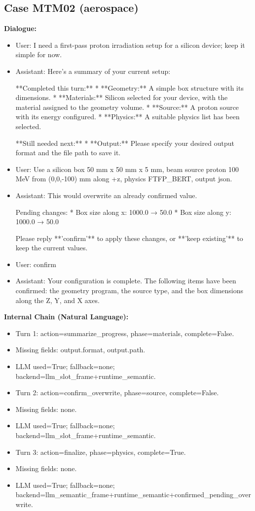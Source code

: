 \documentclass[11pt]{ctexart}
\begin{document}
\subsection{Case MTM02 (aerospace)}
\textbf{Dialogue:}
\begin{itemize}
\item User: I need a first-pass proton irradiation setup for a silicon device; keep it simple for now.
\item Assistant: Here's a summary of your current setup:

**Completed this turn:**
*   **Geometry:** A simple box structure with its dimensions.
*   **Materials:** Silicon selected for your device, with the material assigned to the geometry volume.
*   **Source:** A proton source with its energy configured.
*   **Physics:** A suitable physics list has been selected.

**Still needed next:**
*   **Output:** Please specify your desired output format and the file path to save it.
\item User: Use a silicon box 50 mm x 50 mm x 5 mm, beam source proton 100 MeV from (0,0,-100) mm along +z, physics FTFP\_BERT, output json.
\item Assistant: This would overwrite an already confirmed value.

Pending changes:
*   Box size along x: 1000.0 → 50.0
*   Box size along y: 1000.0 → 50.0

Please reply **'confirm'** to apply these changes, or **'keep existing'** to keep the current values.
\item User: confirm
\item Assistant: Your configuration is complete. The following items have been confirmed: the geometry program, the source type, and the box dimensions along the Z, Y, and X axes.
\end{itemize}
\textbf{Internal Chain (Natural Language):}
\begin{itemize}
\item Turn 1: action=summarize\_progress, phase=materials, complete=False.
\item Missing fields: output.format, output.path.
\item LLM used=True; fallback=none; backend=llm\_slot\_frame+runtime\_semantic.
\item Turn 2: action=confirm\_overwrite, phase=source, complete=False.
\item Missing fields: none.
\item LLM used=True; fallback=none; backend=llm\_slot\_frame+runtime\_semantic.
\item Turn 3: action=finalize, phase=physics, complete=True.
\item Missing fields: none.
\item LLM used=True; fallback=none; backend=llm\_semantic\_frame+runtime\_semantic+confirmed\_pending\_overwrite.
\end{itemize}
\end{document}
